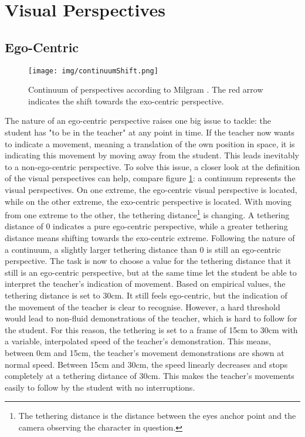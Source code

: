 \newpage
\section{Visual Perspectives}
\subsection{Ego-Centric}
\begin{figure}
	\centering
	\texttt{[image: img/continuumShift.png]}
	\caption{Continuum of perspectives according to Milgram \cite{Milgram1994}. The red arrow indicates the shift towards the exo-centric perspective.}
	\label{fig:continuumShift}
\end{figure}
The nature of an ego-centric perspective raises one big issue to tackle: the student has "to be in the teacher" at any point in time. If the teacher now wants to indicate a movement, meaning a translation of the own position in space, it is indicating this movement by moving away from the student. This leads inevitably to a non-ego-centric perspective. To solve this issue, a closer look at the definition of the visual perspectives can help, compare figure \ref{fig:continuumShift}: a continuum represents the visual perspectives. On one extreme, the ego-centric visual perspective is located, while on the other extreme, the exo-centric perspective is located. With moving from one extreme to the other, the tethering distance\footnote{The tethering distance is the distance between the eyes anchor point and the camera observing the character in question.} is changing. A tethering distance of 0 indicates a pure ego-centric perspective, while a greater tethering distance means shifting towards the exo-centric extreme. Following the nature of a continuum, a slightly larger tethering distance than 0 is still an ego-centric perspective. The task is now to choose a value for the tethering distance that it still is an ego-centric perspective, but at the same time let the student be able to interpret the teacher's indication of movement. 
Based on empirical values, the tethering distance is set to 30cm. It still feels ego-centric, but the indication of the movement of the teacher is clear to recognise. However, a hard threshold would lead to non-fluid demonstrations of the teacher, which is hard to follow for the student. For this reason, the tethering is set to a frame of 15cm to 30cm with a variable, interpolated speed of the teacher's demonstration. This means, between 0cm and 15cm, the teacher's movement demonstrations are shown at normal speed. Between 15cm and 30cm, the speed linearly decreases and stops completely at a tethering distance of 30cm. This makes the teacher's movements easily to follow by the student with no interruptions.\\
